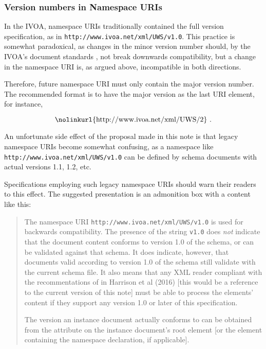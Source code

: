 \documentclass[10pt,a4paper]{ivoa}
\begin{document}
\subsubsection{Version numbers in Namespace URIs}

In the IVOA, namespace URIs traditionally contained the full version
specification, as in \nolinkurl{http://www.ivoa.net/xml/UWS/v1.0}.
This practice is somewhat paradoxical, as changes in the minor version
number should, by the IVOA's document standards
\citep{2010ivoa.spec.0413H}, not break downwards compatibility, but a
change in the namespace URI is, as argued above, incompatible in both
directions.

Therefore, future namespace URI must only contain the major version
number.  The recommended format is to have the major version as the last
URI element, for instance,

$$\hbox{\nolinkurl{http://www.ivoa.net/xml/UWS/2} .}$$

An unfortunate side effect of the proposal made in this note is
that legacy namespace URIs become somewhat confusing, as a namespace
like \nolinkurl{http://www.ivoa.net/xml/UWS/v1.0} can be defined by
schema documents with actual versions 1.1, 1.2, etc.

Specifications employing such legacy namespace URIs should warn their
readers to this effect.  The suggested presentation is an admonition box
with a content like this:

\begin{quotation}
The namespace URI \nolinkurl{http://www.ivoa.net/xml/UWS/v1.0} is used
for backwards compatibility.  The presence of the string \texttt{v1.0}
does \emph{not} indicate that the document content conforms to version
1.0 of the schema, or can be validated against that schema.  It does
indicate, however, that documents valid according to version 1.0 of the
schema still validate with the current schema file.  It also means that
any XML reader compliant with the recommentations of in Harrison et al
(2016) [this would be a reference to the current version of this note]
must be able to process the elements' content if they support any
version 1.0 or later of this specification.

The version an instance document actually conforms to can be obtained
from the  attribute on the instance document's root
element [or the element containing the namespace declaration, if
applicable].
\end{quotation}
\end{document}
